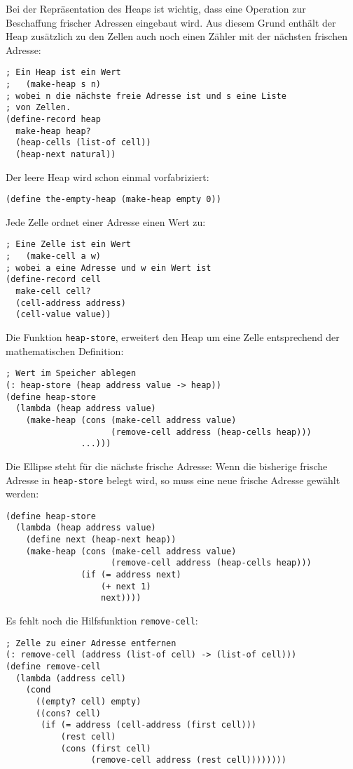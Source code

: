 %
Bei der Repräsentation des Heaps ist wichtig, dass eine Operation zur
Beschaffung frischer Adressen eingebaut wird.  Aus diesem Grund
enthält der Heap zusätzlich zu den Zellen auch noch einen Zähler mit
der nächsten frischen Adresse:
%
\begin{lstlisting}
; Ein Heap ist ein Wert
;   (make-heap s n)
; wobei n die nächste freie Adresse ist und s eine Liste
; von Zellen.
(define-record heap
  make-heap heap?
  (heap-cells (list-of cell))
  (heap-next natural))
\end{lstlisting}
%
Der leere Heap wird schon einmal vorfabriziert:
%
\begin{lstlisting}
(define the-empty-heap (make-heap empty 0))
\end{lstlisting}
%
Jede Zelle ordnet einer Adresse einen Wert zu:
%
\begin{lstlisting}
; Eine Zelle ist ein Wert
;   (make-cell a w)
; wobei a eine Adresse und w ein Wert ist
(define-record cell
  make-cell cell?
  (cell-address address)
  (cell-value value))
\end{lstlisting}
%
Die Funktion \lstinline{heap-store}, erweitert den Heap um eine Zelle
entsprechend der mathematischen Definition:
%
\begin{lstlisting}
; Wert im Speicher ablegen
(: heap-store (heap address value -> heap))
(define heap-store
  (lambda (heap address value)
    (make-heap (cons (make-cell address value)
                     (remove-cell address (heap-cells heap)))
               ...)))
\end{lstlisting}
%
Die Ellipse steht für die nächste frische Adresse: Wenn die bisherige
frische Adresse in \lstinline{heap-store} belegt wird, so muss eine neue
frische Adresse gewählt werden:
%
\begin{lstlisting}
(define heap-store
  (lambda (heap address value)
    (define next (heap-next heap))
    (make-heap (cons (make-cell address value)
                     (remove-cell address (heap-cells heap)))
               (if (= address next)
                   (+ next 1)
                   next))))
\end{lstlisting}
%
Es fehlt noch die Hilfsfunktion \lstinline{remove-cell}:
%
\begin{lstlisting}
; Zelle zu einer Adresse entfernen
(: remove-cell (address (list-of cell) -> (list-of cell)))
(define remove-cell
  (lambda (address cell)
    (cond
      ((empty? cell) empty)
      ((cons? cell)
       (if (= address (cell-address (first cell)))
           (rest cell)
           (cons (first cell)
                 (remove-cell address (rest cell))))))))
\end{lstlisting}
